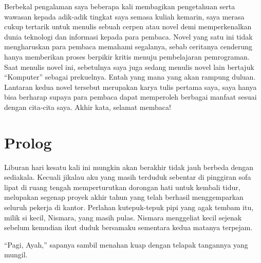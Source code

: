\documentclass[smalldemyvopaper,11pt,twoside,onecolumn,openright,extrafontsizes]{memoir}
\begin{document}

Berbekal pengalaman saya beberapa kali membagikan pengetahuan serta wawasan kepada adik-adik tingkat saya semasa kuliah kemarin, saya merasa cukup tertarik untuk menulis sebuah cerpen atau novel demi memperkenalkan dunia teknologi dan informasi kepada para  pembaca. Novel yang satu ini tidak mengharuskan para pembaca memahami segalanya, sebab ceritanya cenderung hanya memberikan proses berpikir kritis menuju pembelajaran pemrograman. Saat menulis novel ini, sebetulnya saya juga sedang menulis novel lain bertajuk ``Komputer'' sebagai prekuelnya. Entah yang mana yang akan rampung duluan. Lantaran kedua novel tersebut merupakan karya tulis pertama saya, saya hanya bisa berharap supaya para pembaca dapat memperoleh berbagai manfaat sesuai dengan cita-cita saya. Akhir kata, selamat membaca!



\mainmatter{}




\chapter*{Prolog}

Liburan hari kesatu kali ini mungkin akan berakhir tidak jauh berbeda dengan sediakala. Kecuali jikalau aku yang masih terduduk sebentar di pinggiran sofa lipat di ruang tengah memperturutkan dorongan hati untuk kembali tidur, melupakan segenap proyek akhir tahun yang telah berhasil menggemparkan seluruh pekerja di kantor. Perlahan kutepuk-tepuk pipi yang agak tembam itu, milik si kecil, Nismara, yang masih pulas. Nismara menggeliat kecil sejenak sebelum kemudian ikut duduk bersamaku sementara kedua matanya terpejam.

``Pagi, Ayah,'' sapanya sambil menahan kuap dengan telapak tangannya yang mungil.
\end{document}
